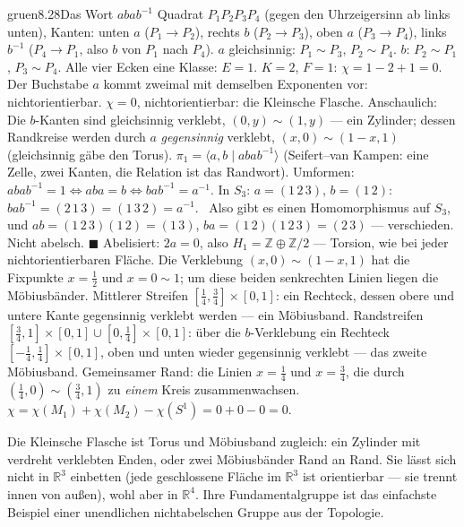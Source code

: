 \begin{loesungkarte}{gruen}{8.28}{Das Wort $abab^{-1}$}
Quadrat $P_1P_2P_3P_4$ (gegen den Uhrzeigersinn ab links unten), Kanten: unten $a$ ($P_1\to P_2$), rechts $b$ ($P_2\to P_3$), oben $a$ ($P_3\to P_4$), links $b^{-1}$ ($P_4\to P_1$, also $b$ von $P_1$ nach $P_4$). $a$ gleichsinnig: $P_1\sim P_3$, $P_2\sim P_4$. $b$: $P_2\sim P_1$, $P_3\sim P_4$. Alle vier Ecken eine Klasse: $E = 1$.
$K = 2$, $F = 1$: $\chi = 1 - 2 + 1 = 0$. Der Buchstabe $a$ kommt zweimal mit demselben Exponenten vor: nichtorientierbar. $\chi = 0$, nichtorientierbar: die Kleinsche Flasche. Anschaulich: Die $b$-Kanten sind gleichsinnig verklebt, $(0, y)\sim(1, y)$ --- ein Zylinder; dessen Randkreise werden durch $a$ \emph{gegensinnig} verklebt, $(x, 0)\sim(1 - x, 1)$ (gleichsinnig gäbe den Torus).
$\pi_1 = \langle a, b\mid abab^{-1}\rangle$ (Seifert--van Kampen: eine Zelle, zwei Kanten, die Relation ist das Randwort). Umformen: $abab^{-1} = 1\iff aba = b\iff bab^{-1} = a^{-1}$. In $S_3$: $a = (1\,2\,3)$, $b = (1\,2)$: $bab^{-1} = (2\,1\,3) = (1\,3\,2) = a^{-1}$. \checkmark\ Also gibt es einen Homomorphismus auf $S_3$, und $ab = (1\,2\,3)(1\,2) = (1\,3)$, $ba = (1\,2)(1\,2\,3) = (2\,3)$ --- verschieden. Nicht abelsch. $\blacksquare$ Abelisiert: $2a = 0$, also $H_1 = \mathbb Z\oplus\mathbb Z/2$ --- Torsion, wie bei jeder nichtorientierbaren Fläche.
Die Verklebung $(x, 0)\sim(1 - x, 1)$ hat die Fixpunkte $x = \frac12$ und $x = 0\sim1$; um diese beiden senkrechten Linien liegen die Möbiusbänder. Mittlerer Streifen $[\frac14, \frac34]\times[0, 1]$: ein Rechteck, dessen obere und untere Kante gegensinnig verklebt werden --- ein Möbiusband. Randstreifen $[\frac34, 1]\times[0, 1]\cup[0, \frac14]\times[0, 1]$: über die $b$-Verklebung ein Rechteck $[-\frac14, \frac14]\times[0, 1]$, oben und unten wieder gegensinnig verklebt --- das zweite Möbiusband. Gemeinsamer Rand: die Linien $x = \frac14$ und $x = \frac34$, die durch $(\frac14, 0)\sim(\frac34, 1)$ zu \emph{einem} Kreis zusammenwachsen. $\chi = \chi(M_1) + \chi(M_2) - \chi(S^{1}) = 0 + 0 - 0 = 0$. \checkmark
{}
\begin{mitnehmen}\kastentext
Die Kleinsche Flasche ist Torus und Möbiusband zugleich: ein Zylinder mit verdreht verklebten Enden, oder zwei Möbiusbänder Rand an Rand. Sie lässt sich nicht in $\mathbb R^{3}$ einbetten (jede geschlossene Fläche im $\mathbb R^{3}$ ist orientierbar --- sie trennt innen von außen), wohl aber in $\mathbb R^{4}$. Ihre Fundamentalgruppe ist das einfachste Beispiel einer unendlichen nichtabelschen Gruppe aus der Topologie.
\end{mitnehmen}
\end{loesungkarte}

